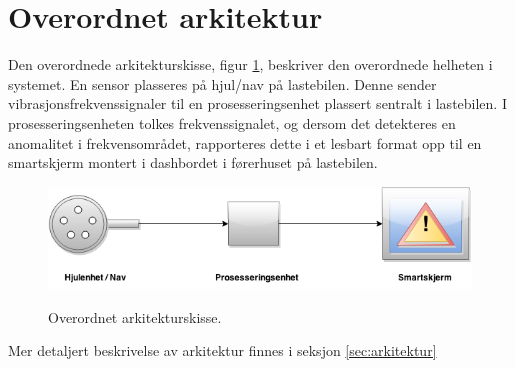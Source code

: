 \section{Overordnet arkitektur}
Den overordnede arkitekturskisse, figur \ref{fig:overordnet-ark}, 
beskriver den overordnede helheten i systemet. En sensor plasseres på 
hjul/nav på lastebilen. Denne sender vibrasjonsfrekvenssignaler til en 
prosesseringsenhet plassert sentralt i lastebilen. I prosesseringsenheten 
tolkes frekvenssignalet, og dersom det detekteres en anomalitet i 
frekvensområdet, rapporteres dette i et lesbart format opp til en 
smartskjerm montert i dashbordet i førerhuset på lastebilen.
\newline
\begin{figure}[H]
	\centering
	\includegraphics[width=1.00\textwidth]{images/arkitektur-overordnet.png}
	\label{fig:overordnet-ark}
	\caption{Overordnet arkitekturskisse.}
\end{figure}

Mer detaljert beskrivelse av arkitektur finnes i seksjon \ref{sec:arkitektur}
